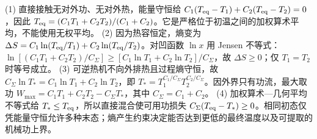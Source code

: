 (1) 直接接触无对外功、无对外热，能量守恒给 \(C_1(T_{\rm eq}-T_1)+C_2(T_{\rm eq}-T_2)=0\)，因此 \(T_{\rm eq}=(C_1T_1+C_2T_2)/(C_1+C_2)\)。它是严格位于初温之间的加权算术平均，不能使用无权平均。
(2) 因为热容恒定，熵变为 \(\Delta S=C_1\ln(T_{\rm eq}/T_1)+C_2\ln(T_{\rm eq}/T_2)\)。对凹函数 \(\ln x\) 用 Jensen 不等式：\(\ln[(C_1T_1+C_2T_2)/C_\Sigma]\ge[C_1\ln T_1+C_2\ln T_2]/C_\Sigma\)，故 \(\Delta S\ge0\)；仅 \(T_1=T_2\) 时等号成立。
(3) 可逆热机不向外排热且过程熵守恒，故 \(C_\Sigma\ln T_*=C_1\ln T_1+C_2\ln T_2\)，即 \(T_*=T_1^{C_1/C_\Sigma}T_2^{C_2/C_\Sigma}\)。因外界只有功流，最大取功 \(W_{\max}=C_1T_1+C_2T_2-C_\Sigma T_*\)，其中 \(C_\Sigma=C_1+C_2\)。
(4) 加权算术—几何平均不等式给 \(T_*\le T_{\rm eq}\)，所以直接混合使可用功损失 \(C_\Sigma(T_{\rm eq}-T_*)\ge0\)。相同初态仅凭能量守恒允许多种末态；熵产生约束决定能否达到更低的最终温度以及可提取的机械功上界。
